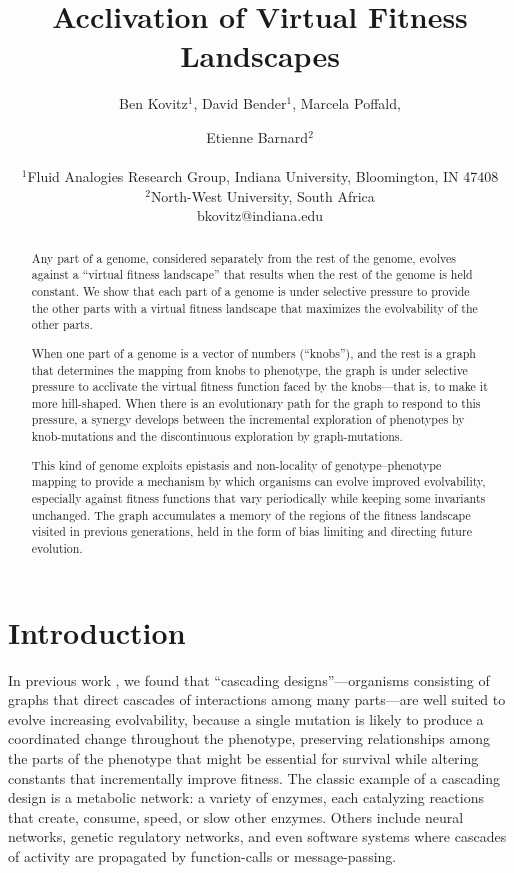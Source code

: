 \documentclass[letterpaper]{article}
\title{Acclivation of Virtual Fitness Landscapes}
\author{Ben Kovitz$^{1}$, David Bender$^{1}$, Marcela Poffald, \and Etienne
Barnard$^{2}$ \\
\mbox{}\\
$^1$Fluid Analogies Research Group, Indiana University, Bloomington, IN 47408 \\
$^2$North-West University, South Africa \\
bkovitz@indiana.edu}
\begin{document}
\maketitle

\begin{abstract}
Any part of a genome, considered separately from the rest of the genome,
evolves against a ``virtual fitness landscape'' that results when the rest of
the genome is held constant. We show that each part of a genome is under
selective pressure to provide the other parts with a virtual fitness landscape
that maximizes the evolvability of the other parts.

When one part of a genome is a vector of numbers (``knobs''), and the rest is a
graph that determines the mapping from knobs to phenotype, the graph is under
selective pressure to acclivate the virtual fitness function faced by the
knobs---that is, to make it more hill-shaped. When there is an evolutionary
path for the graph to respond to this pressure, a synergy develops between the
incremental exploration of phenotypes by knob-mutations and the discontinuous
exploration by graph-mutations.

This kind of genome exploits epistasis and non-locality of genotype--phenotype
mapping to provide a mechanism by which organisms can evolve improved
evolvability, especially against fitness functions that vary periodically while
keeping some invariants unchanged. The graph accumulates a memory of the
regions of the fitness landscape visited in previous generations, held in the
form of bias limiting and directing future evolution.
\end{abstract}

%

\section{Introduction}

In previous work \citep{kovitz2015experiments}, we found that ``cascading
designs''---organisms consisting of graphs that direct cascades of interactions
among many parts---are well suited to evolve increasing evolvability, because
a single mutation is likely to produce a coordinated change throughout the
phenotype, preserving relationships among the parts of the phenotype that might
be essential for survival while altering constants that incrementally improve
fitness. The classic example of a cascading design is a metabolic network: a
variety of enzymes, each catalyzing reactions that create, consume, speed, or
slow other enzymes. Others include neural networks, genetic regulatory
networks, and even software systems where cascades of activity are propagated
by function-calls or message-passing.
\end{document}
